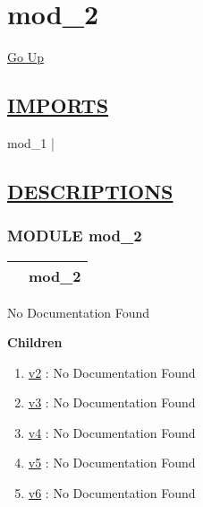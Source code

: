 \chapter*{\color{headfile}
mod_2
}
\hypertarget{ecldoc:toc:mod_2}{}
\hyperlink{ecldoc:toc:root}{Go Up}

\section*{\underline{\textsf{IMPORTS}}}
\begin{doublespace}
{\large
mod\_1 |
}
\end{doublespace}

\section*{\underline{\textsf{DESCRIPTIONS}}}
\subsection*{\textsf{\colorbox{headtoc}{\color{white} MODULE}
mod\_2}}

\hypertarget{ecldoc:mod_2}{}

{\renewcommand{\arraystretch}{1.5}
\begin{tabularx}{\textwidth}{|>{\raggedright\arraybackslash}l|X|}
\hline
\hspace{0pt}\mytexttt{\color{red} } & \textbf{mod\_2} \\
\hline
\end{tabularx}
}

\par





No Documentation Found







\textbf{Children}
\begin{enumerate}
\item \hyperlink{ecldoc:mod_1}{v2}
: No Documentation Found
\item \hyperlink{ecldoc:mod_2.v3}{v3}
: No Documentation Found
\item \hyperlink{ecldoc:mod_2.v4}{v4}
: No Documentation Found
\item \hyperlink{ecldoc:mod_2.v5}{v5}
: No Documentation Found
\item \hyperlink{ecldoc:mod_2.v6}{v6}
: No Documentation Found
\end{enumerate}

